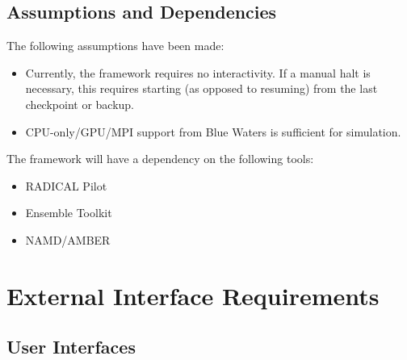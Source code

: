 \documentclass{scrreprt}
\begin{document}
\section{Assumptions and Dependencies}



The following assumptions have been made:
\begin{itemize}[noitemsep]
\item Currently, the framework requires no interactivity. If a manual halt is necessary, this requires starting (as opposed to resuming) from the last checkpoint or backup.
\item CPU-only/GPU/MPI support from Blue Waters is sufficient  for simulation.
\end{itemize}

The framework will have a dependency on the following tools:

\begin{itemize}[noitemsep]
\item RADICAL Pilot
\item Ensemble Toolkit
\item NAMD/AMBER 
\end{itemize}



\chapter{External Interface Requirements}

\section{User Interfaces}
\end{document}
